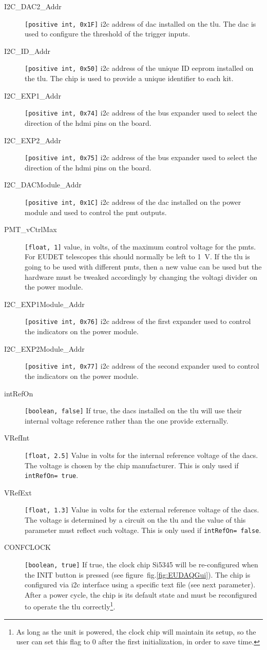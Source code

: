 \begin{description}
  \item[I2C\_DAC2\_Addr] \verb|[positive int, 0x1F]| \gls{i2c} address of \gls{dac} installed on the \gls{tlu}. The \gls{dac} is used to configure the threshold of the trigger inputs.
  \item[I2C\_ID\_Addr] \verb|[positive int, 0x50]| \gls{i2c} address of the unique ID \gls{eeprom} installed on the \gls{tlu}. The chip is used to provide a unique identifier to each kit.
  \item[I2C\_EXP1\_Addr] \verb|[positive int, 0x74]| \gls{i2c} address of the bus expander used to select the direction of the \gls{hdmi} pins on the board.
  \item[I2C\_EXP2\_Addr] \verb|[positive int, 0x75]| \gls{i2c} address of the bus expander used to select the direction of the \gls{hdmi} pins on the board.
  \item[I2C\_DACModule\_Addr] \verb|[positive int, 0x1C]| \gls{i2c} address of the \gls{dac} installed on the power module and used to control the \gls{pmt} outputs.
  \item[PMT\_vCtrlMax] \verb|[float, 1]| value, in volts, of the maximum control voltage for the \gls{pmt}s. For EUDET telescopes this should normally be left to 1~V. If the \gls{tlu} is going to be used with different \gls{pmt}s, then a new value can be used but the hardware must be tweaked accordingly by changing the voltagi divider on the power module.
  \item[I2C\_EXP1Module\_Addr] \verb|[positive int, 0x76]| \gls{i2c} address of the first expander used to control the indicators on the power module.
  \item[I2C\_EXP2Module\_Addr] \verb|[positive int, 0x77]| \gls{i2c} address of the second expander used to control the indicators on the power module.
  \item[intRefOn] \verb|[boolean, false]| If true, the \gls{dac}s installed on the \gls{tlu} will use their internal voltage reference rather than the one provide externally.
  \item[VRefInt] \verb|[float, 2.5]| Value in volts for the internal reference voltage of the \gls{dac}s. The voltage is chosen by the chip manufacturer. This is only used if \verb|intRefOn= true|.
  \item[VRefExt] \verb|[float, 1.3]| Value in volts for the external reference voltage of the \gls{dac}s. The voltage is determined by a circuit on the \gls{tlu} and the value of this parameter must reflect such voltage. This is only used if \verb|intRefOn= false|.
  \item[CONFCLOCK] \verb|[boolean, true]| If true, the clock chip Si5345 will be re-configured when the INIT button is pressed (see figure~fig.\ref{fig:EUDAQGui}). The chip is configured via \gls{i2c} interface using a specific text file (see next parameter). After a power cycle, the chip is its default state and must be reconfigured to operate the \gls{tlu} correctly\footnote{As long as the unit is powered, the clock chip will maintain its setup, so the user can set this flag to 0 after the first initialization, in order to save time.}.

\end{description}
